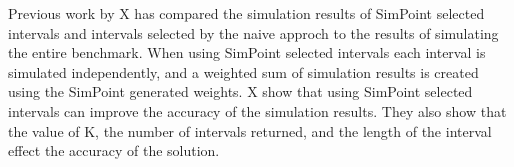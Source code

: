 Previous work by X has compared the simulation results of SimPoint selected intervals and intervals selected by the naive approch to the results of simulating the entire benchmark.
When using SimPoint selected intervals each interval is simulated independently, and a weighted sum of simulation results is created using the SimPoint generated weights.
X show that using SimPoint selected intervals can improve the accuracy of the simulation results. They also show that the value of K, the number of intervals returned, and the length of the interval effect the accuracy of the solution. 